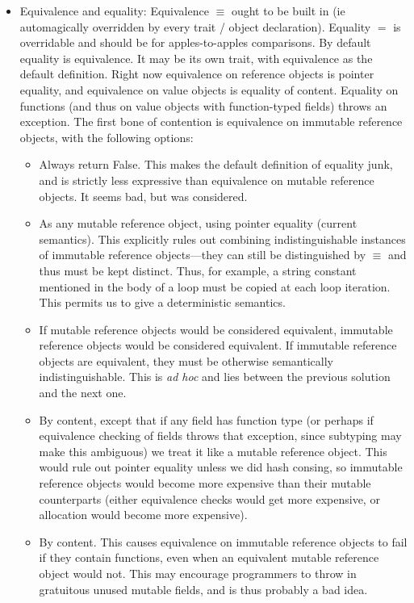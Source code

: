 \begin{itemize}
\item Equivalence and equality:
  Equivalence $\equiv$ ought to be built in (ie automagically overridden by every trait / object declaration).
  Equality $=$ is overridable and should be for apples-to-apples comparisons.  By default equality is equivalence.  It may be its own trait, with equivalence as the default definition.
  Right now equivalence on reference objects is pointer equality, and equivalence on value objects is equality of content.  Equality on functions (and thus on value objects with function-typed fields) throws an exception.  The first bone of contention is equivalence on immutable reference objects, with the following options:
  \begin{itemize}
     \item Always return False.  This makes the default definition of equality junk, and is strictly less expressive than equivalence on mutable reference objects.  It seems bad, but was considered.
     \item As any mutable reference object, using pointer equality (current semantics).  This explicitly rules out combining indistinguishable instances of immutable reference objects---they can still be distinguished by $\equiv$ and thus must be kept distinct.  Thus, for example, a string constant mentioned in the body of a loop must be copied at each loop iteration.  This permits us to give a deterministic semantics.
     \item If mutable reference objects would be considered equivalent, immutable reference objects would be considered equivalent.  If immutable reference objects are equivalent, they must be otherwise semantically indistinguishable.  This is \emph{ad hoc} and lies between the previous solution and the next one.
     \item By content, except that if any field has function type (or perhaps if equivalence checking of fields throws that exception, since subtyping may make this ambiguous) we treat it like a mutable reference object.  This would rule out pointer equality unless we did hash consing, so immutable reference objects would become more expensive than their mutable counterparts (either equivalence checks would get more expensive, or allocation would become more expensive).
     \item By content.  This causes equivalence on immutable reference objects to fail if they contain functions, even when an equivalent mutable reference object would not.  This may encourage programmers to throw in gratuitous unused mutable fields, and is thus probably a bad idea.

\end{itemize}
\end{itemize}
